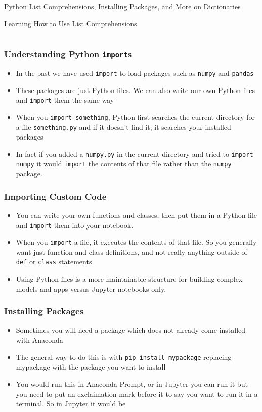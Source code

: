 \documentclass[handout, 11pt]{beamer}
\begin{document}
\begin{section}{Python List Comprehensions, Installing Packages, and More on Dictionaries}
\begin{frame}
{\begin{block}{Learning How to Use List Comprehensions}
\begin{tabular*}{\textwidth}{@{\extracolsep{\fill}}ccc}
\end{tabular*}
\end{block}
}
\label{labs:list-comprehensions-lab-1}
\end{frame}
\begin{frame}
\frametitle{Understanding Python \texttt{import}s}
\begin{itemize}
\item In the past we have used
\texttt{import}
to load packages such as
\texttt{numpy}
and
\texttt{pandas}
\vfill
\item These packages are just Python files. We can also write our own Python files and
\texttt{import}
them the same way
\vfill
\item When you \texttt{import something}, Python first searches the current directory for a file
\texttt{something.py}
and if it doesn't find it, it searches your installed packages
\vfill
\item In fact if you added a
\texttt{numpy.py}
in the current directory and tried to
\texttt{import}
\texttt{numpy}
it would
\texttt{import}
the contents of that file rather than the
\texttt{numpy}
package.
\end{itemize}
\end{frame}
\begin{frame}
\frametitle{Importing Custom Code}
\begin{itemize}
\item You can write your own functions and classes, then put them in a Python file and
\texttt{import}
them into your notebook.
\vfill
\item When you
\texttt{import}
a file, it executes the contents of that file. So you generally want just function and class definitions, and not really anything outside of
\texttt{def}
or
\texttt{class}
statements.
\vfill
\item Using Python files is a more maintainable structure for building complex models and apps versus Jupyter notebooks only.
\end{itemize}
\end{frame}
\begin{frame}
\frametitle{Installing Packages}
\begin{itemize}
\item Sometimes you will need a package which does not already come installed with Anaconda
\vfill
\item The general way to do this is with
\texttt{pip install mypackage}
replacing mypackage with
the package you want to install
\vfill
\item You would run this in Anaconda Prompt, or in Jupyter you can run it but you need to put an exclaimation mark before it to say you want to run it in a terminal. So in Jupyter it would be

\end{itemize}
\end{frame}
\end{section}
\end{document}
